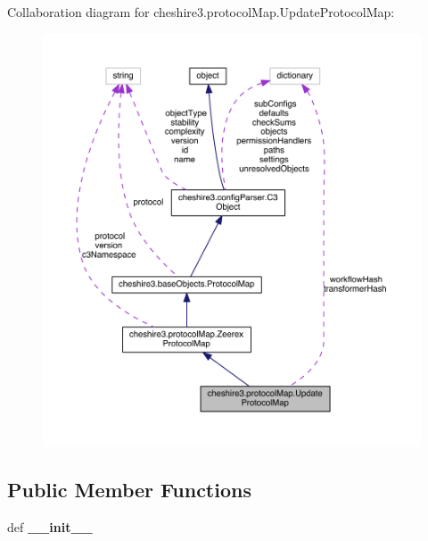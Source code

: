 Collaboration diagram for cheshire3.\-protocol\-Map.\-Update\-Protocol\-Map\-:
\nopagebreak
\begin{figure}[H]
\begin{center}
\leavevmode
\includegraphics[width=350pt]{classcheshire3_1_1protocol_map_1_1_update_protocol_map__coll__graph}
\end{center}
\end{figure}
\subsection*{Public Member Functions}
\begin{DoxyCompactItemize}
\item 
\hypertarget{classcheshire3_1_1protocol_map_1_1_update_protocol_map_a145aaaa7d84b6a5179a05d163f5d9b0a}{def {\bfseries \-\_\-\-\_\-init\-\_\-\-\_\-}}\label{classcheshire3_1_1protocol_map_1_1_update_protocol_map_a145aaaa7d84b6a5179a05d163f5d9b0a}

\end{DoxyCompactItemize}
